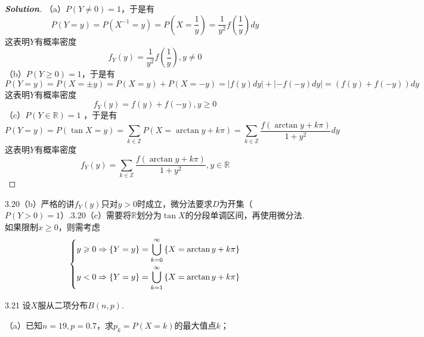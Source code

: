 \documentclass[10pt, a4paper, oneside]{ctexart}
\newenvironment{solution}{\begin{proof}[\bf Solution]}{\end{proof}}
\begin{document}
\begin{solution}

（a）$P(Y\ne 0)=1$，于是有
    \[P(Y=y)=P(X^{-1}=y)=P(X=\frac{1}{y})=\frac{1}{y^2}f(\frac{1}{y})dy\]
这表明$Y$有概率密度
\[{f_Y}(y) = \frac{1}{{{y^2}}}f(\frac{1}{y}),y \ne 0\]
（b）$P(Y\geqslant 0)=1$，于是有
\[P(Y = y) = P(X =  \pm y) = P(X = y) + P(X =  - y) = \left| {f(y)dy} \right| + \left| { - f( - y)dy} \right| = \left( {f(y) + f( - y)} \right)dy\]
    这表明$Y$有概率密度
\[{f_Y}(y) = f(y) + f( - y),y \geqslant 0\]
（c）$P(Y\in \mathbb{R})=1$ ，于是有
    \[P(Y = y) = P(\tan X = y) = \sum\limits_{k \in \mathbb{Z}} {P(X = \arctan y + k\pi )}  = \sum\limits_{k \in \mathbb{Z}} {\frac{{f(\arctan y + k\pi )}}{{1 + {y^2}}}} dy\]
    这表明$Y$有概率密度
\[{f_Y}(y) = \sum\limits_{k \in \mathbb{Z}} {\frac{{f(\arctan y + k\pi )}}{{1 + {y^2}}}} ,y \in \mathbb{R}\]
\end{solution}
\begin{remark}
3.20（b）严格的讲$f_Y(y)$只对$y>0$时成立，微分法要求$D$为开集（$P(Y>0)=1$）.3.20（c）需要将$\mathbb{R}$划分为$\tan X$的分段单调区间，再使用微分法.如果限制$x\geqslant 0$，则需考虑
\[\left\{ \begin{gathered}
  y \geqslant 0 \Rightarrow \left\{ {Y = y} \right\} = \bigcup\limits_{k = 0}^\infty  {\left\{ {X = \arctan y + k\pi } \right\}}  \hfill \\
  y < 0 \Rightarrow \left\{ {Y = y} \right\} = \bigcup\limits_{k = 1}^\infty  {\left\{ {X = \arctan y + k\pi } \right\}}  \hfill \\ 
\end{gathered}  \right.\]
\end{remark}

3.21 设$X$服从二项分布$B(n,p)$.

（a）已知$n=19,p=0.7$，求$p_k=P(X=k)$的最大值点$k$；
\end{document}

